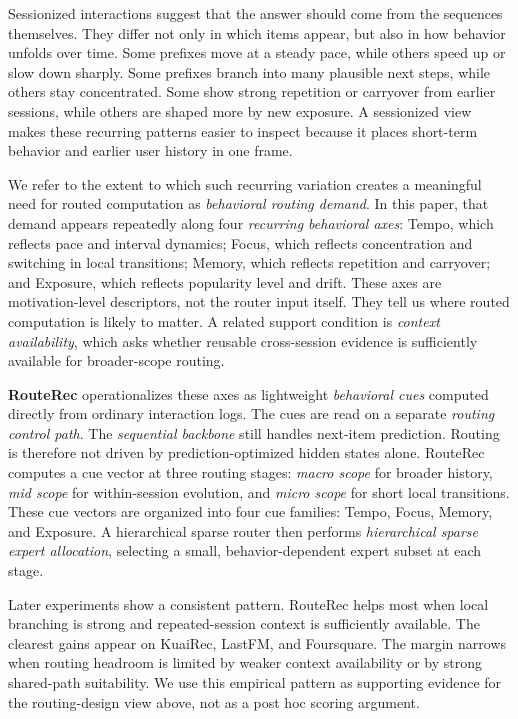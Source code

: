 \documentclass[sigconf,review,anonymous]{acmart}
\begin{document}
Sessionized interactions suggest that the answer should come from the sequences themselves. They differ not only in which items appear, but also in how behavior unfolds over time. Some prefixes move at a steady pace, while others speed up or slow down sharply. Some prefixes branch into many plausible next steps, while others stay concentrated. Some show strong repetition or carryover from earlier sessions, while others are shaped more by new exposure. A sessionized view makes these recurring patterns easier to inspect because it places short-term behavior and earlier user history in one frame.

We refer to the extent to which such recurring variation creates a meaningful need for routed computation as \emph{behavioral routing demand}. In this paper, that demand appears repeatedly along four \emph{recurring behavioral axes}: Tempo, which reflects pace and interval dynamics; Focus, which reflects concentration and switching in local transitions; Memory, which reflects repetition and carryover; and Exposure, which reflects popularity level and drift. These axes are motivation-level descriptors, not the router input itself. They tell us where routed computation is likely to matter. A related support condition is \emph{context availability}, which asks whether reusable cross-session evidence is sufficiently available for broader-scope routing.

\textbf{RouteRec} operationalizes these axes as lightweight \emph{behavioral cues} computed directly from ordinary interaction logs. The cues are read on a separate \emph{routing control path}. The \emph{sequential backbone} still handles next-item prediction. Routing is therefore not driven by prediction-optimized hidden states alone. RouteRec computes a cue vector at three routing stages: \emph{macro scope} for broader history, \emph{mid scope} for within-session evolution, and \emph{micro scope} for short local transitions. These cue vectors are organized into four cue families: Tempo, Focus, Memory, and Exposure. A hierarchical sparse router then performs \emph{hierarchical sparse expert allocation}, selecting a small, behavior-dependent expert subset at each stage.

Later experiments show a consistent pattern. RouteRec helps most when local branching is strong and repeated-session context is sufficiently available. The clearest gains appear on KuaiRec, LastFM, and Foursquare. The margin narrows when routing headroom is limited by weaker context availability or by strong shared-path suitability. We use this empirical pattern as supporting evidence for the routing-design view above, not as a post hoc scoring argument.
\end{document}
